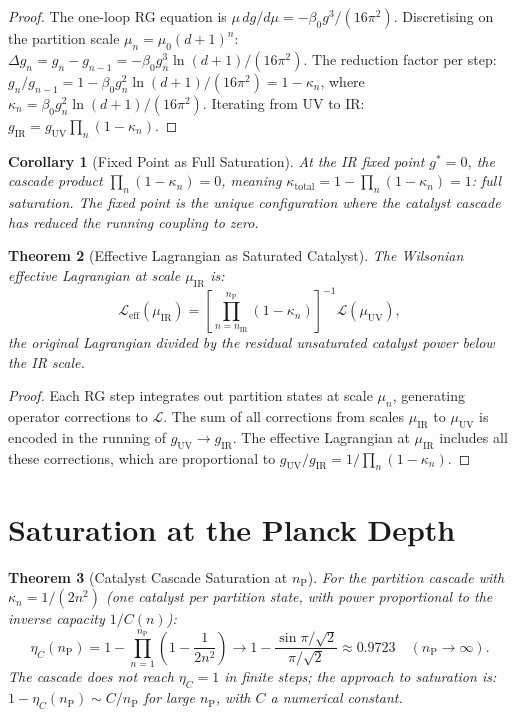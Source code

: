 \documentclass[twocolumn,10pt,a4paper]{article}
\theoremstyle{thmstyle}
\newtheorem{theorem}{Theorem}[section]
\newtheorem{corollary}[theorem]{Corollary}
\theoremstyle{definition}
\theoremstyle{remark}
\newcommand{\nP}{n_{\mathrm{P}}}
\newcommand{\catpow}{\kappa}
\newcommand{\etaC}{\eta_{C}}
\newcommand{\Leff}{\mathcal{L}_{\mathrm{eff}}}
\begin{document}
\begin{proof}
The one-loop RG equation is $\mu\,dg/d\mu = -\beta_0 g^3/(16\pi^2)$.
Discretising on the partition scale $\mu_n = \mu_0(d+1)^n$:
$\Delta g_n = g_n - g_{n-1} = -\beta_0 g_n^3\ln(d+1)/(16\pi^2)$.
The reduction factor per step:
$g_n/g_{n-1} = 1 - \beta_0 g_n^2\ln(d+1)/(16\pi^2) = 1 - \catpow_n$,
where $\catpow_n = \beta_0 g_n^2\ln(d+1)/(16\pi^2)$.
Iterating from UV to IR:
$g_{\mathrm{IR}} = g_{\mathrm{UV}}\prod_n(1-\catpow_n)$.
\end{proof}

\begin{corollary}[Fixed Point as Full Saturation]
At the IR fixed point $g^* = 0$, the cascade product
$\prod_n(1-\catpow_n) = 0$, meaning
$\catpow_{\mathrm{total}} = 1 - \prod_n(1-\catpow_n) = 1$: full saturation.
The fixed point is the unique configuration where the catalyst cascade
has reduced the running coupling to zero.
\end{corollary}

\begin{theorem}[Effective Lagrangian as Saturated Catalyst]
\label{thm:eff_lag}
The Wilsonian effective Lagrangian at scale $\mu_{\mathrm{IR}}$ is:
\begin{equation}
\Leff(\mu_{\mathrm{IR}}) = \left[\prod_{n=n_{\mathrm{IR}}}^{\nP}(1-\catpow_n)\right]^{-1}
\mathcal{L}(\mu_{\mathrm{UV}}),
\label{eq:eff_lag}
\end{equation}
the original Lagrangian divided by the residual unsaturated catalyst power
below the IR scale.
\end{theorem}

\begin{proof}
Each RG step integrates out partition states at scale $\mu_n$, generating
operator corrections to $\mathcal{L}$. The sum of all corrections from
scales $\mu_{\mathrm{IR}}$ to $\mu_{\mathrm{UV}}$ is encoded in the
running of $g_{\mathrm{UV}} \to g_{\mathrm{IR}}$.
The effective Lagrangian at $\mu_{\mathrm{IR}}$ includes all these corrections,
which are proportional to $g_{\mathrm{UV}}/g_{\mathrm{IR}}
= 1/\prod_n(1-\catpow_n)$.
\end{proof}

\section{Saturation at the Planck Depth}
\label{sec:planck_saturation}

\begin{theorem}[Catalyst Cascade Saturation at $\nP$]
\label{thm:saturation}
For the partition cascade with $\catpow_n = 1/(2n^2)$ (one catalyst per
partition state, with power proportional to the inverse capacity $1/C(n)$):
\begin{equation}
\etaC(\nP) = 1 - \prod_{n=1}^{\nP}\!\left(1 - \frac{1}{2n^2}\right)
\to 1 - \frac{\sin\pi/\sqrt{2}}{\pi/\sqrt{2}}
\approx 0.9723 \quad (\nP \to \infty).
\label{eq:saturation}
\end{equation}
The cascade does not reach $\etaC = 1$ in finite steps; the approach
to saturation is:
$1 - \etaC(\nP) \sim C/\nP$ for large $\nP$, with $C$ a numerical constant.
\end{theorem}
\end{document}
